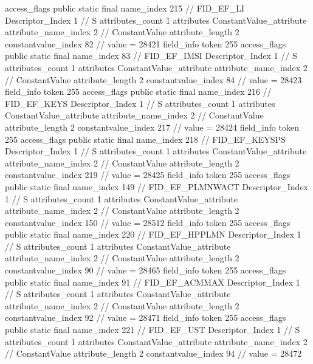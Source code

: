 {{{{{				access_flags	public static final
				name_index	215		// FID_EF_LI
				Descriptor_Index	1		// S
				attributes_count	1
				attributes {
				ConstantValue_attribute {
					attribute_name_index	2		// ConstantValue
					attribute_length	2
					constantvalue_index	82		// value = 28421
				}
				}
			}
			field_info {
				token	255
				access_flags	public static final
				name_index	83		// FID_EF_IMSI
				Descriptor_Index	1		// S
				attributes_count	1
				attributes {
				ConstantValue_attribute {
					attribute_name_index	2		// ConstantValue
					attribute_length	2
					constantvalue_index	84		// value = 28423
				}
				}
			}
			field_info {
				token	255
				access_flags	public static final
				name_index	216		// FID_EF_KEYS
				Descriptor_Index	1		// S
				attributes_count	1
				attributes {
				ConstantValue_attribute {
					attribute_name_index	2		// ConstantValue
					attribute_length	2
					constantvalue_index	217		// value = 28424
				}
				}
			}
			field_info {
				token	255
				access_flags	public static final
				name_index	218		// FID_EF_KEYSPS
				Descriptor_Index	1		// S
				attributes_count	1
				attributes {
				ConstantValue_attribute {
					attribute_name_index	2		// ConstantValue
					attribute_length	2
					constantvalue_index	219		// value = 28425
				}
				}
			}
			field_info {
				token	255
				access_flags	public static final
				name_index	149		// FID_EF_PLMNWACT
				Descriptor_Index	1		// S
				attributes_count	1
				attributes {
				ConstantValue_attribute {
					attribute_name_index	2		// ConstantValue
					attribute_length	2
					constantvalue_index	150		// value = 28512
				}
				}
			}
			field_info {
				token	255
				access_flags	public static final
				name_index	220		// FID_EF_HPPLMN
				Descriptor_Index	1		// S
				attributes_count	1
				attributes {
				ConstantValue_attribute {
					attribute_name_index	2		// ConstantValue
					attribute_length	2
					constantvalue_index	90		// value = 28465
				}
				}
			}
			field_info {
				token	255
				access_flags	public static final
				name_index	91		// FID_EF_ACMMAX
				Descriptor_Index	1		// S
				attributes_count	1
				attributes {
				ConstantValue_attribute {
					attribute_name_index	2		// ConstantValue
					attribute_length	2
					constantvalue_index	92		// value = 28471
				}
				}
			}
			field_info {
				token	255
				access_flags	public static final
				name_index	221		// FID_EF_UST
				Descriptor_Index	1		// S
				attributes_count	1
				attributes {
				ConstantValue_attribute {
					attribute_name_index	2		// ConstantValue
					attribute_length	2
					constantvalue_index	94		// value = 28472
}}}}}}}
